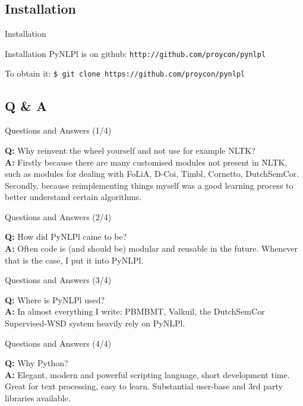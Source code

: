 \documentclass[compress]{beamer}
\begin{document}
\subsection{Installation}

\begin{frame}{Installation}

    \begin{block}{Installation}
        PyNLPl is on github:        
        \texttt{http://github.com/proycon/pynlpl}
        
        To obtain it: 
        \texttt{\$ git clone https://github.com/proycon/pynlpl}
    \end{block}

\end{frame}

\subsection{Q \& A}

\begin{frame}{Questions and Answers (1/4)}

        \textbf{Q:} Why reinvent the wheel yourself and not use for example NLTK? \\
        \textbf{A:} Firstly because there are many customised modules not present in NLTK, such as modules for dealing with FoLiA, D-Coi, Timbl, Cornetto, DutchSemCor. Secondly, because reimplementing things myself was a good learning process to better understand certain algorithms.
\end{frame}


\begin{frame}{Questions and Answers (2/4)}
        
        \textbf{Q:} How did PyNLPl came to be? \\
        \textbf{A:} Often code is (and should be) modular and reusable in the future. Whenever that is the case, I put it into PyNLPl.
\end{frame}

\begin{frame}{Questions and Answers (3/4)}
        
        \textbf{Q:} Where is PyNLPl used? \\
        \textbf{A:} In almost everything I write: PBMBMT, Valkuil, the DutchSemCor Supervised-WSD system heavily rely on PyNLPl.
\end{frame}
        
\begin{frame}{Questions and Answers (4/4)}

        \textbf{Q:} Why Python? \\
        \textbf{A:} Elegant, modern and powerful scripting language, short development time. Great for text processing, easy to learn. Substantial user-base and 3rd party libraries available.        
\end{frame}
\end{document}
